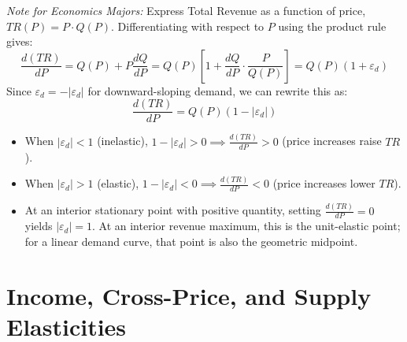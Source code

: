 \documentclass[11pt,letterpaper]{article}
\begin{document}
\begin{tcolorbox}[colback=CourseTeal!6!white,colframe=CourseTeal,title=\textbf{Optional Advanced Section: Calculus Proof of the Total Revenue Test}]
\small
\emph{Note for Economics Majors:}
Express Total Revenue as a function of price, $TR(P) = P \cdot Q(P)$. Differentiating with respect to $P$ using the product rule gives:
\[
\frac{d(TR)}{dP} = Q(P) + P \frac{dQ}{dP} = Q(P) \left[ 1 + \frac{dQ}{dP} \cdot \frac{P}{Q(P)} \right] = Q(P) \left( 1 + \varepsilon_d \right)
\]
Since $\varepsilon_d = -|\varepsilon_d|$ for downward-sloping demand, we can rewrite this as:
\[
\frac{d(TR)}{dP} = Q(P) \left( 1 - |\varepsilon_d| \right)
\]
\begin{itemize}
    \item When $|\varepsilon_d| < 1$ (inelastic), $1 - |\varepsilon_d| > 0 \implies \frac{d(TR)}{dP} > 0$ (price increases raise $TR$).
    \item When $|\varepsilon_d| > 1$ (elastic), $1 - |\varepsilon_d| < 0 \implies \frac{d(TR)}{dP} < 0$ (price increases lower $TR$).
    \item At an interior stationary point with positive quantity, setting $\frac{d(TR)}{dP}=0$ yields $|\varepsilon_d|=1$. At an interior revenue maximum, this is the unit-elastic point; for a linear demand curve, that point is also the geometric midpoint.
\end{itemize}
\end{tcolorbox}

\section{Income, Cross-Price, and Supply Elasticities}
\end{document}
